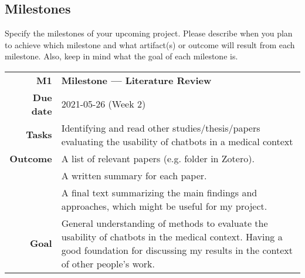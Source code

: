 \subsection{Milestones}
\label{subsec:milestone}
Specify the milestones of your upcoming project. Please describe when you plan to achieve which milestone and what artifact(s) or outcome will result from each milestone. Also, keep in mind what the goal of each milestone is.


\begin{table}[htbp]
\small
\colorbox{usethiscolorhere}{
\centering
\begin{tabularx}{\textwidth}{@{} r Y @{}}
	\textbf{M1}
	& \textbf{Milestone --- Literature Review}\vspace{2mm}\\
	\textbf{Due date} & 2021-05-26 (Week $2$)\vspace{2mm}\\
     \textbf{Tasks} & Identifying and read other studies/thesis/papers evaluating the usability of chatbots in a medical context\vspace{2mm}\\
    \textbf{Outcome} & A list of relevant papers (e.g. folder in Zotero).\\
    & A written summary for each paper.\\
    & A final text summarizing the main findings and approaches, which might be useful for my project. \vspace{2mm}\\
    \textbf{Goal} & General understanding of methods to evaluate the usability of chatbots in the medical context. Having a good foundation for discussing my results in the context of other people's work.\vspace{2mm}\\
    
\end{tabularx}
}
\end{table}


